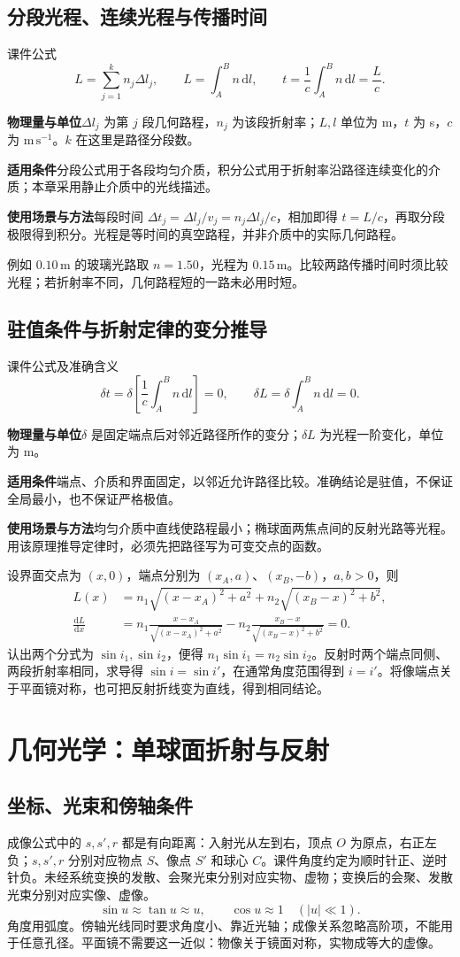 \documentclass[UTF8,fontset=none,zihao=-4,a4paper]{ctexart}
\newcommand{\chapterpage}[1]{\clearpage\section{#1}}
\newcommand{\unit}[1]{\,\mathrm{#1}}
\newcommand{\explain}[3]{\par\noindent\textbf{物理量与单位}\quad #1\par
\noindent\textbf{适用条件}\quad #2\par
\noindent\textbf{使用场景与方法}\quad #3\par}
\begin{document}
\subsection{分段光程、连续光程与传播时间}
\begin{infobox}{课件公式}
\[
 L=\sum_{j=1}^k n_j\Delta l_j,\qquad
 L=\int_A^B n\,\mathrm dl,\qquad
 t=\frac1c\int_A^B n\,\mathrm dl=\frac Lc.
\]
\end{infobox}
\explain{$\Delta l_j$ 为第 $j$ 段几何路程，$n_j$ 为该段折射率；$L,l$ 单位为 m，$t$ 为 s，$c$ 为 $\mathrm{m\,s^{-1}}$。$k$ 在这里是路径分段数。}{分段公式用于各段均匀介质，积分公式用于折射率沿路径连续变化的介质；本章采用静止介质中的光线描述。}{每段时间 $\Delta t_j=\Delta l_j/v_j=n_j\Delta l_j/c$，相加即得 $t=L/c$，再取分段极限得到积分。光程是等时间的真空路程，并非介质中的实际几何路程。}
例如 $0.10\unit m$ 的玻璃光路取 $n=1.50$，光程为 $0.15\unit m$。比较两路传播时间时须比较光程；若折射率不同，几何路程短的一路未必用时短。

\subsection{驻值条件与折射定律的变分推导}
\begin{infobox}{课件公式及准确含义}
\[
 \delta t=\delta\left[\frac1c\int_A^B n\,\mathrm dl\right]=0,
 \qquad\delta L=\delta\int_A^B n\,\mathrm dl=0.
\]
\end{infobox}
\explain{$\delta$ 是固定端点后对邻近路径所作的变分；$\delta L$ 为光程一阶变化，单位为 m。}{端点、介质和界面固定，以邻近允许路径比较。准确结论是驻值，不保证全局最小，也不保证严格极值。}{均匀介质中直线使路程最小；椭球面两焦点间的反射光路等光程。用该原理推导定律时，必须先把路径写为可变交点的函数。}
设界面交点为 $(x,0)$，端点分别为 $(x_A,a)$、$(x_B,-b)$，$a,b>0$，则
\begin{align*}
 L(x)&=n_1\sqrt{(x-x_A)^2+a^2}+n_2\sqrt{(x_B-x)^2+b^2},\\
 \frac{\mathrm dL}{\mathrm dx}
 &=n_1\frac{x-x_A}{\sqrt{(x-x_A)^2+a^2}}
 -n_2\frac{x_B-x}{\sqrt{(x_B-x)^2+b^2}}=0.
\end{align*}
认出两个分式为 $\sin i_1,\sin i_2$，便得 $n_1\sin i_1=n_2\sin i_2$。反射时两个端点同侧、两段折射率相同，求导得 $\sin i=\sin i'$，在通常角度范围得到 $i=i'$。将像端点关于平面镜对称，也可把反射折线变为直线，得到相同结论。

\chapterpage{几何光学：单球面折射与反射}
\subsection{坐标、光束和傍轴条件}
成像公式中的 $s,s',r$ 都是有向距离：入射光从左到右，顶点 $O$ 为原点，右正左负；$s,s',r$ 分别对应物点 $S$、像点 $S'$ 和球心 $C$。课件角度约定为顺时针正、逆时针负。未经系统变换的发散、会聚光束分别对应实物、虚物；变换后的会聚、发散光束分别对应实像、虚像。
\[
 \sin u\approx\tan u\approx u,\qquad \cos u\approx1
 \quad(|u|\ll1).
\]
角度用弧度。傍轴光线同时要求角度小、靠近光轴；成像关系忽略高阶项，不能用于任意孔径。平面镜不需要这一近似：物像关于镜面对称，实物成等大的虚像。
\end{document}
